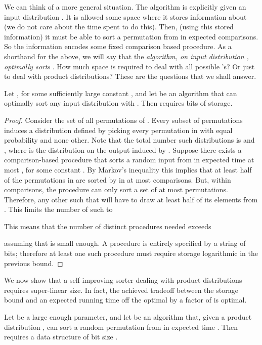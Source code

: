 \documentclass{siamltex}
\begin{document}
We can think of a more general situation. The algorithm is explicitly
given an input distribution . It is allowed some space where it 
stores information about  (we do not care about the
time spent to do this). Then, (using this stored information)
it must be able to sort a permutation from  in 
expected  comparisons.
So the information encodes some fixed comparison based procedure.
As a shorthand for the above, we will say that the \emph{algorithm,
on input distribution , optimally sorts }.
How much space is required to deal with all possible 's?
Or just to deal with product distributions? These are the
questions that we shall answer.
\medskip
\begin{lemma}\label{lem:exp-lower-bound} 
Let , for some sufficiently large constant 
, and let  be an algorithm that can optimally sort any input 
distribution  with .
Then  requires  bits of storage.
\end{lemma}

\begin{proof}
Consider the set of all  permutations of .
Every subset  of  permutations induces a distribution 
defined by picking every permutation in  with equal probability
and none other. Note that the total number such distributions  is
 and ,
where  is the distribution on the output  induced by
.
Suppose there exists a comparison-based procedure  that sorts 
a random input from  in expected time at most , 
for some constant .
By Markov's inequality this implies that 
at least half of the permutations in  are sorted by 
 in at most  comparisons.
But, within  comparisons, the procedure 
 can only sort a set  of at most  permutations. 
Therefore, any other  such that 
will have to draw at least half of its elements from .
This limits the number of such  to 

This means that the number of distinct procedures needed
exceeds 

assuming that  is small enough.
A procedure is entirely specified by a string of bits; therefore 
at least one such procedure must require storage logarithmic in the previous 
bound.
\end{proof}
\medskip

We now show that a self-improving sorter dealing with product
distributions requires super-linear size.
In fact, the achieved tradeoff between the  storage bound 
and an expected running time off the optimal by a factor of  
is optimal.
\medskip
\begin{lemma}\label{lem:space-lb}
Let  be a large enough parameter, and
let  be an algorithm that, given a product 
distribution , can sort a random permutation from 
in expected time . Then  requires 
a data structure of bit size .
\end{lemma}
\end{document}
